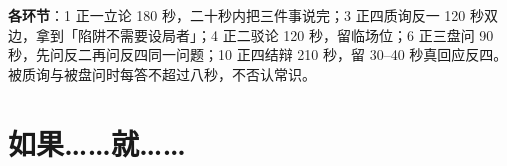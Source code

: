 \documentclass[quick,pro]{debate}
\begin{document}
\textbf{各环节}：1 正一立论 180 秒，二十秒内把三件事说完；3 正四质询反一 120 秒双边，拿到「陷阱不需要设局者」；4 正二驳论 120 秒，留临场位；6 正三盘问 90 秒，先问反二再问反四同一问题；10 正四结辩 210 秒，留 30–40 秒真回应反四。被质询与被盘问时每答不超过八秒，不否认常识。

\section{如果……就……}
\begin{contingency}
\end{contingency}
\end{document}
